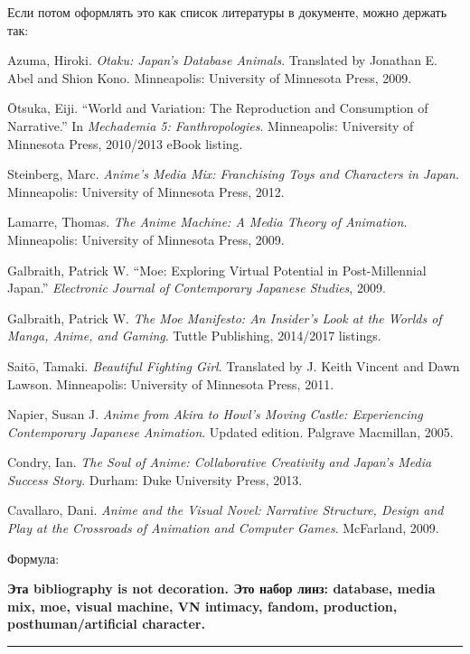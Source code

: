 Если потом оформлять это как список литературы в документе, можно
держать так:

Azuma, Hiroki. \emph{Otaku: Japan's Database Animals}. Translated by
Jonathan E. Abel and Shion Kono. Minneapolis: University of Minnesota
Press, 2009.

Ōtsuka, Eiji. ``World and Variation: The Reproduction and Consumption of
Narrative.'' In \emph{Mechademia 5: Fanthropologies}. Minneapolis:
University of Minnesota Press, 2010/\hspace{0pt}2013 eBook listing.

Steinberg, Marc. \emph{Anime's Media Mix: Franchising Toys and
Characters in Japan}. Minneapolis: University of Minnesota Press, 2012.

Lamarre, Thomas. \emph{The Anime Machine: A Media Theory of Animation}.
Minneapolis: University of Minnesota Press, 2009.

Galbraith, Patrick W. ``Moe: Exploring Virtual Potential in
Post-Millennial Japan.'' \emph{Electronic Journal of Contemporary
Japanese Studies}, 2009.

Galbraith, Patrick W. \emph{The Moe Manifesto: An Insider's Look at the
Worlds of Manga, Anime, and Gaming}. Tuttle Publishing, 2014/\hspace{0pt}2017
listings.

Saitō, Tamaki. \emph{Beautiful Fighting Girl}. Translated by J. Keith
Vincent and Dawn Lawson. Minneapolis: University of Minnesota Press,
2011.

Napier, Susan J. \emph{Anime from Akira to Howl's Moving Castle:
Experiencing Contemporary Japanese Animation}. Updated edition. Palgrave
Macmillan, 2005.

Condry, Ian. \emph{The Soul of Anime: Collaborative Creativity and
Japan's Media Success Story}. Durham: Duke University Press, 2013.

Cavallaro, Dani. \emph{Anime and the Visual Novel: Narrative Structure,
Design and Play at the Crossroads of Animation and Computer Games}.
McFarland, 2009.

Формула:

\textbf{Эта bibliography is not decoration. Это набор линз: database,
media mix, moe, visual machine, VN intimacy, fandom, production,
posthuman/\hspace{0pt}artificial character.}

\begin{center}\rule{0.5\linewidth}{0.5pt}\end{center}

